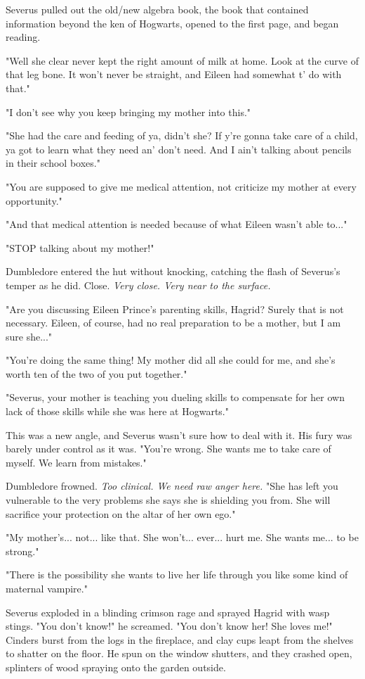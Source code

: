 \documentclass[a4paper,11pt]{article}
\begin{document}
Severus pulled out the old/new algebra book, the book that contained information beyond the ken of Hogwarts, opened to the first page, and began reading.

"Well she clear never kept the right amount of milk at home. Look at the curve of that leg bone. It won't never be straight, and Eileen had somewhat t' do with that."

"I don't see why you keep bringing my mother into this."

"She had the care and feeding of ya, didn't she? If y're gonna take care of a child, ya got to learn what they need an' don't need. And I ain't talking about pencils in their school boxes."

"You are supposed to give me medical attention, not criticize my mother at every opportunity."

"And that medical attention is needed because of what Eileen wasn't able to..."

"STOP talking about my mother!"

Dumbledore entered the hut without knocking, catching the flash of Severus's temper as he did. Close. \emph{Very close. Very near to the surface.}

"Are you discussing Eileen Prince's parenting skills, Hagrid? Surely that is not necessary. Eileen, of course, had no real preparation to be a mother, but I am sure she..."

"You're doing the same thing! My mother did all she could for me, and she's worth ten of the two of you put together."

"Severus, your mother is teaching you dueling skills to compensate for her own lack of those skills while she was here at Hogwarts."

This was a new angle, and Severus wasn't sure how to deal with it. His fury was barely under control as it was. "You're wrong. She wants me to take care of myself. We learn from mistakes."

Dumbledore frowned. \emph{Too clinical. We need raw anger here.} "She has left you vulnerable to the very problems she says she is shielding you from. She will sacrifice your protection on the altar of her own ego."

"My mother's... not... like that. She won't... ever... hurt me. She wants me... to be strong."

"There is the possibility she wants to live her life through you like some kind of maternal vampire."

Severus exploded in a blinding crimson rage and sprayed Hagrid with wasp stings. "You don't know!" he screamed. "You don't know her! She loves me!" Cinders burst from the logs in the fireplace, and clay cups leapt from the shelves to shatter on the floor. He spun on the window shutters, and they crashed open, splinters of wood spraying onto the garden outside.
\end{document}
